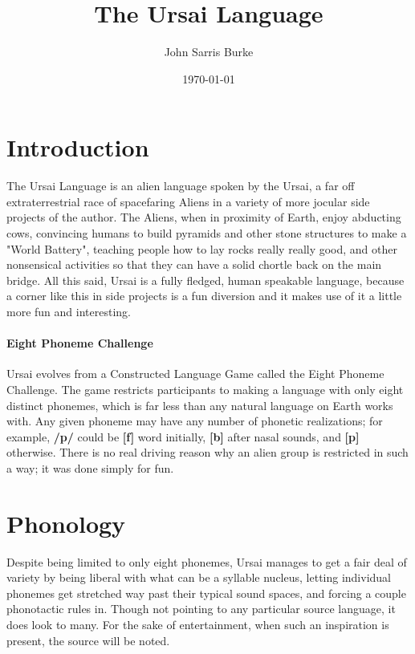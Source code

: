 \documentclass[11pt,letterpaper]{article}
\title{The Ursai Language}
\date{\today}
\author{John Sarris Burke}
\begin{document}
\maketitle
\tableofcontents
\pagebreak
\listoffigures
\listoftables
\pagebreak

\section{Introduction}
	The Ursai Language is an alien language spoken by the Ursai, a far off extraterrestrial race of spacefaring Aliens in a variety of more jocular side projects of the author.  The Aliens, when in proximity of Earth, enjoy abducting cows, convincing humans to build pyramids and other stone structures to make a "World Battery", teaching people how to lay rocks really really good, and other nonsensical activities so that they can have a solid chortle back on the main bridge. All this said, Ursai is a fully fledged, human speakable language, because a corner like this in side projects is a fun diversion and it makes use of it a little more fun and interesting.  
	\paragraph{Eight Phoneme Challenge}
	Ursai evolves from a Constructed Language Game called the Eight Phoneme Challenge.  The game restricts participants to making a language with only eight distinct phonemes, which is far less than any natural language on Earth works with.  Any given phoneme may have any number of phonetic realizations; for example, \textbf{/p/} could be \textbf{[f]} word initially, \textbf{[b]} after nasal sounds, and \textbf{[p]} otherwise.  There is no real driving reason why an alien group is restricted in such a way; it was done simply for fun.

\pagebreak
\section{Phonology}
	Despite being limited to only eight phonemes, Ursai manages to get a fair deal of variety by being liberal with what can be a syllable nucleus, letting individual phonemes get stretched way past their typical sound spaces, and forcing a couple phonotactic rules in.  Though not pointing to any particular source language, it does look to many.  For the sake of entertainment, when such an inspiration is present, the source will be noted.
\end{document}

